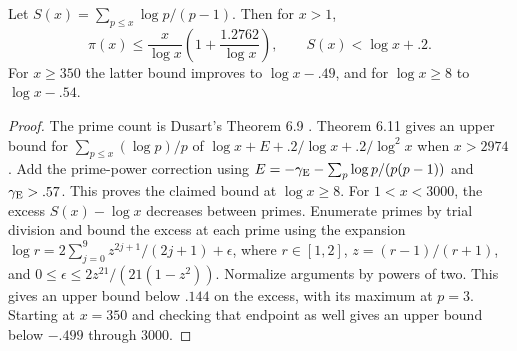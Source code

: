 \begin{lemma}\label{lem:prime-estimates}
Let \(S(x)=\sum_{p\le x}\log p/(p-1)\). Then for \(x>1\),
\[
 \pi(x)\le\frac{x}{\log x}\left(1+\frac{1.2762}{\log x}\right),
 \qquad S(x)<\log x+.2.
\]
For \(x\ge350\) the latter bound improves to \(\log x-.49\),
and for \(\log x\ge8\) to \(\log x-.54\).
\end{lemma}

\begin{proof}
The prime count is Dusart's Theorem 6.9 \cite{dusart-primes}.
Theorem 6.11 gives an upper bound for
\(\sum_{p\le x}(\log p)/p\) of
\(\log x+E+.2/\log x+.2/\log^2 x\) when \(x>2974\).
Add the prime-power correction using
\(E=-\gamma_{\rm E}-\sum_p\log p/(p(p-1))\) and
\(\gamma_{\rm E}>.57\). This proves the claimed bound
at \(\log x\ge8\). For \(1<x<3000\), the excess \(S(x)-\log x\)
decreases between primes. Enumerate primes by trial division
and bound the excess at each prime using the expansion
\(\log r=2\sum_{j=0}^9 z^{2j+1}/(2j+1)+\epsilon\), where
\(r\in[1,2]\), \(z=(r-1)/(r+1)\), and
\(0\le\epsilon\le2z^{21}/(21(1-z^2))\).
Normalize arguments by powers of two. This gives an upper
bound below \(.144\) on the excess, with its maximum at \(p=3\).
Starting at \(x=350\) and checking that endpoint as well gives
an upper bound below \(-.499\) through \(3000\).
\end{proof}

